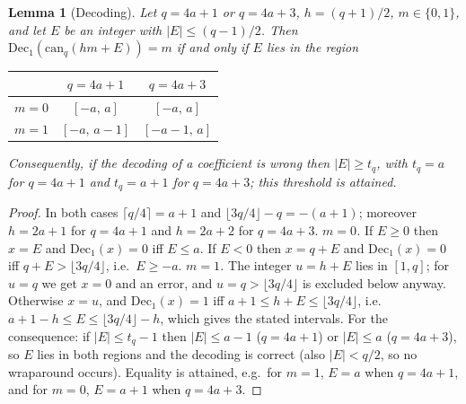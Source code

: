 \documentclass[11pt]{article}
\newtheorem{lemma}{Lemma}
\theoremstyle{remark}
\begin{document}
\begin{lemma}[Decoding]\label{lem:dec}
Let $q=4a+1$ or $q=4a+3$, $h=(q+1)/2$, $m\in\{0,1\}$, and let $E$ be an integer with $|E|\le(q-1)/2$. Then $\mathrm{Dec}_1(\mathrm{can}_q(hm+E))=m$ if and only if $E$ lies in the region
\begin{center}\small\begin{tabular}{lcc}\toprule
 & $q=4a+1$ & $q=4a+3$\\\midrule
$m=0$ & $[-a,\,a]$ & $[-a,\,a]$\\
$m=1$ & $[-a,\,a-1]$ & $[-a-1,\,a]$\\\bottomrule
\end{tabular}\end{center}
Consequently, if the decoding of a coefficient is wrong then $|E|\ge t_q$, with $t_q=a$ for $q=4a+1$ and $t_q=a+1$ for $q=4a+3$; this threshold is attained.
\end{lemma}
\begin{proof}
In both cases $\lceil q/4\rceil=a+1$ and $\lfloor3q/4\rfloor-q=-(a+1)$; moreover $h=2a+1$ for $q=4a+1$ and $h=2a+2$ for $q=4a+3$.
\emph{$m=0$.} If $E\ge0$ then $x=E$ and $\mathrm{Dec}_1(x)=0$ iff $E\le a$. If $E<0$ then $x=q+E$ and $\mathrm{Dec}_1(x)=0$ iff $q+E>\lfloor3q/4\rfloor$, i.e.\ $E\ge-a$.
\emph{$m=1$.} The integer $u=h+E$ lies in $[1,q]$; for $u=q$ we get $x=0$ and an error, and $u=q>\lfloor3q/4\rfloor$ is excluded below anyway. Otherwise $x=u$, and $\mathrm{Dec}_1(x)=1$ iff $a+1\le h+E\le\lfloor3q/4\rfloor$, i.e.\ $a+1-h\le E\le\lfloor3q/4\rfloor-h$, which gives the stated intervals.
For the consequence: if $|E|\le t_q-1$ then $|E|\le a-1$ ($q=4a+1$) or $|E|\le a$ ($q=4a+3$), so $E$ lies in both regions and the decoding is correct (also $|E|<q/2$, so no wraparound occurs). Equality is attained, e.g.\ for $m=1$, $E=a$ when $q=4a+1$, and for $m=0$, $E=a+1$ when $q=4a+3$.
\end{proof}
\end{document}
